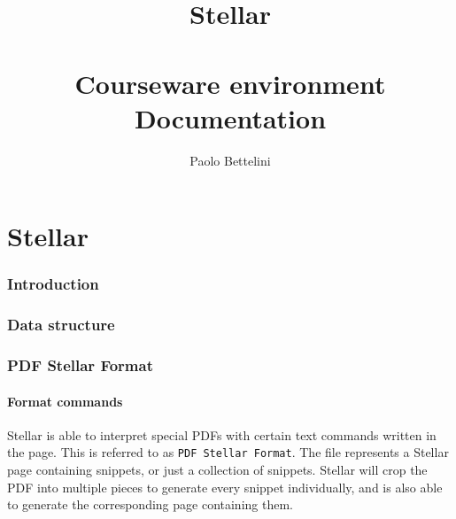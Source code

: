 \documentclass[a4paper]{article}
\title{%
    Stellar \\
    \phantom{} \\
    \Large Courseware environment \\
    \Large Documentation
}
\author{Paolo Bettelini}
\date{}
\begin{document}
\maketitle
\tableofcontents
\pagebreak

\part{Stellar}

\section{Introduction}

\section{Data structure}


\pagebreak

\section{PDF Stellar Format}

\subsection{Format commands}

Stellar is able to interpret special PDFs with certain text commands written in the page.
This is referred to as \texttt{PDF Stellar Format}.
The file represents a Stellar page containing snippets, or just a collection of snippets.
Stellar will crop the PDF into multiple pieces to generate every snippet individually,
and is also able to generate the corresponding page containing them.
\end{document}
